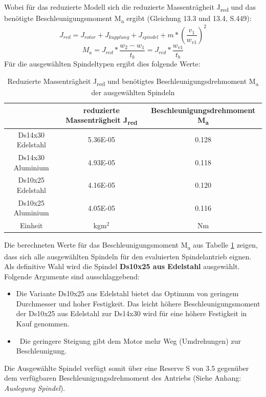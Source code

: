 Wobei für das reduzierte Modell sich die reduzierte Massenträgheit J\textsubscript{red} und das benötigte Beschleunigungsmoment M\textsubscript{a} ergibt (Gleichung 13.3 und 13.4, S.449):
\begin{equation}
J_{red}=J_{rotor}+J_{kupplung}+J_{spindel}+m*(\frac{v_{1}}{w_{v1}})^{2}
\end{equation}
\begin{equation}
M_{a}=J_{red}*\frac{w_{2}-w_{1}}{t_{b}}=J_{red}*\frac{w_{v1}}{t_{b}}
\end{equation}
Für die ausgewählten Spindeltypen ergibt dies folgende Werte:

\begin{table}[H]
\begin{tabular}{|c|c|c|}
	\hline 
	& reduzierte Massenträgheit J\textsubscript{red}& Beschleunigungsdrehmoment M\textsubscript{a}\\ 
	\hline 
	Ds14x30 Edelstahl & 5.36E-05 & 0.128 \\ 
	\hline 
	Ds14x30 Aluminium & 4.93E-05 & 0.118 \\ 
	\hline 
	Ds10x25 Edelstahl & 4.16E-05 & 0.120 \\ 
	\hline 
	Ds10x25 Aluminium & 4.05E-05 & 0.116 \\ 
	\hline 
	Einheit & kgm$^2$ & Nm \\ 
	\hline 
\end{tabular} 
\caption{Reduzierte Massenträgheit J\textsubscript{red} und benötigtes Beschleunigungsdrehmoment M\textsubscript{a} der ausgewählten Spindeln}
\label{tab:spindel_final}
\end{table}
Die berechneten Werte für das Beschleunigungsmoment M\textsubscript{a} aus Tabelle \ref{tab:spindel_final} zeigen, dass sich alle ausgewählten Spindeln für den evaluierten Spindelantrieb eignen.
\newline
Als definitive Wahl wird die Spindel \textbf{Ds10x25 aus Edelstahl} ausgewählt. Folgende Argumente sind ausschlaggebend:
	\begin{itemize}
	\item Die Variante Ds10x25 aus Edelstahl bietet das Optimum von geringem Durchmesser und hoher Festigkeit. Das leicht höhere Beschleunigungsmoment der Ds10x25 aus Edelstahl zur Ds14x30 wird für eine höhere Festigkeit in Kauf genommen.
	
	\item \ Die geringere Steigung gibt dem Motor mehr Weg (Umdrehungen) zur Beschleunigung.
\end{itemize}
Die Ausgewählte Spindel verfügt somit über eine Reserve S von 3.5 gegenüber dem verfügbaren Beschleunigungsdrehmoment des Antriebs (Siehe Anhang: \textit{Auslegung Spindel}).


